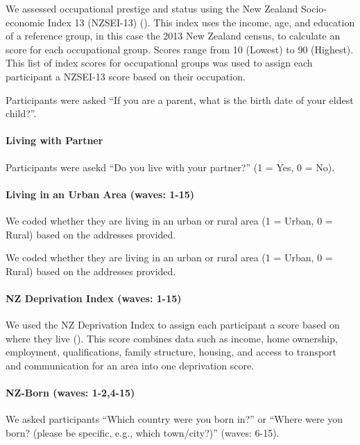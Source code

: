 \documentclass[
  singlecolumn]{article}
\let\oldparagraph\paragraph
\renewcommand{\paragraph}[1]{\oldparagraph{#1}\mbox{}}
\begin{document}
We assessed occupational prestige and status using the New Zealand
Socio-economic Index 13 (NZSEI-13) (). This index uses the income, age, and education of
a reference group, in this case the 2013 New Zealand census, to
calculate an score for each occupational group. Scores range from 10
(Lowest) to 90 (Highest). This list of index scores for occupational
groups was used to assign each participant a NZSEI-13 score based on
their occupation.

Participants were asked ``If you are a parent, what is the birth date of
your eldest child?''.

\paragraph{Living with Partner}\label{living-with-partner}

Participants were asekd ``Do you live with your partner?'' (1 = Yes, 0 =
No).

\paragraph{Living in an Urban Area (waves:
1-15)}\label{living-in-an-urban-area-waves-1-15}

We coded whether they are living in an urban or rural area (1 = Urban, 0
= Rural) based on the addresses provided.

We coded whether they are living in an urban or rural area (1 = Urban, 0
= Rural) based on the addresses provided.

\paragraph{NZ Deprivation Index (waves:
1-15)}\label{nz-deprivation-index-waves-1-15}

We used the NZ Deprivation Index to assign each participant a score
based on where they live (). This score combines data such as income, home ownership,
employment, qualifications, family structure, housing, and access to
transport and communication for an area into one deprivation score.

\paragraph{NZ-Born (waves: 1-2,4-15)}\label{nz-born-waves-1-24-15}

We asked participants ``Which country were you born in?'' or ``Where
were you born? (please be specific, e.g., which town/city?)'' (waves:
6-15).
\end{document}
